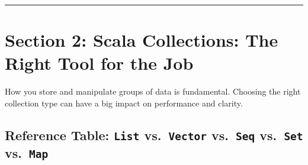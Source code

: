\documentclass[
  letterpaper,
  DIV=11,
  numbers=noendperiod]{scrreprt}
\begin{document}
\begin{center}\rule{0.5\linewidth}{0.5pt}\end{center}

\section{\texorpdfstring{\textbf{Section 2: Scala Collections: The Right
Tool for the
Job}}{Section 2: Scala Collections: The Right Tool for the Job}}\label{section-2-scala-collections-the-right-tool-for-the-job}

How you store and manipulate groups of data is fundamental. Choosing the
right collection type can have a big impact on performance and clarity.

\subsection{\texorpdfstring{\textbf{Reference Table: \texttt{List}
vs.~\texttt{Vector} vs.~\texttt{Seq} vs.~\texttt{Set}
vs.~\texttt{Map}}}{Reference Table: List vs.~Vector vs.~Seq vs.~Set vs.~Map}}\label{reference-table-list-vs.-vector-vs.-seq-vs.-set-vs.-map}
\end{document}
